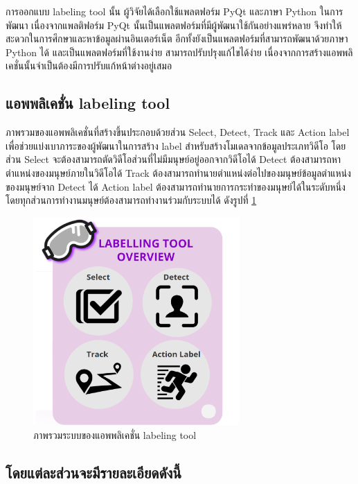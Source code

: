 การออกแบบ labeling tool นั้น ผู้วิจัยได้เลือกใช้แพลตฟอร์ม PyQt และภาษา Python ในการพัฒนา
เนื่องจากแพลติฟอร์ม PyQt นั้นเป็นแพลตฟอร์มที่มีผู้พัฒนาใช้กันอย่างแพร่หลาย จึงทำให้สะดวกในการศึกษาและหาข้อมูลผ่านอินเตอร์เน็ต
อีกทั้งยังเป็นแพลตฟอร์มที่สามารถพัฒนาด้วยภาษา Python ได้ และเป็นแพลตฟอร์มที่ใช้งานง่าย สามารถปรับปรุงแก้ไขได้ง่าย
เนื่องจากการสร้างแอพพลิเคชั่นนั้นจำเป็นต้องมีการปรับแก้หน้าต่างอยู่เสมอ

\subsection{แอพพลิเคชั่น labeling tool}
ภาพรวมของแอพพลิเคชั่นที่สร้างขึ้นประกอบด้วยส่วน Select, Detect, Track และ Action label
เพื่อช่วยแบ่งเบาภาระของผู้พัฒนาในการสร้าง label สำหรับสร้างโมเดลจากข้อมูลประเภทวิดีโอ โดยส่วน Select
จะต้องสามารถตัดวิดีโอส่วนที่ไม่มีมนุษย์อยู่ออกจากวิดีโอได้ Detect ต้องสามารถหาตำแหน่งของมนุษย์ภายในวิดีโอได้
Track ต้องสามารถทำนายตำแหน่งต่อไปของมนุษย์ข้อมูลตำแหน่งของมนุษย์จาก Detect ได้
Action label ต้องสามารถทำนายการกระทำของมนุษย์ได้ในระดับหนึ่ง โดยทุกส่วนการทำงานมนุษย์ต้องสามารถทำงานร่วมกับระบบได้
ดังรูปที่ \ref{fig:labeling_overview}

\begin{figure}[!ht]
    \centering
    \includegraphics[width=0.7\textwidth]{chapter3/images/3_6/labelingToolOverview.png}
    \caption{ภาพรวมระบบของแอพพลิเคชั่น labeling tool}
    \label{fig:labeling_overview}
\end{figure}

\clearpage
\subsection*{โดยแต่ละส่วนจะมีรายละเอียดดังนี้}
